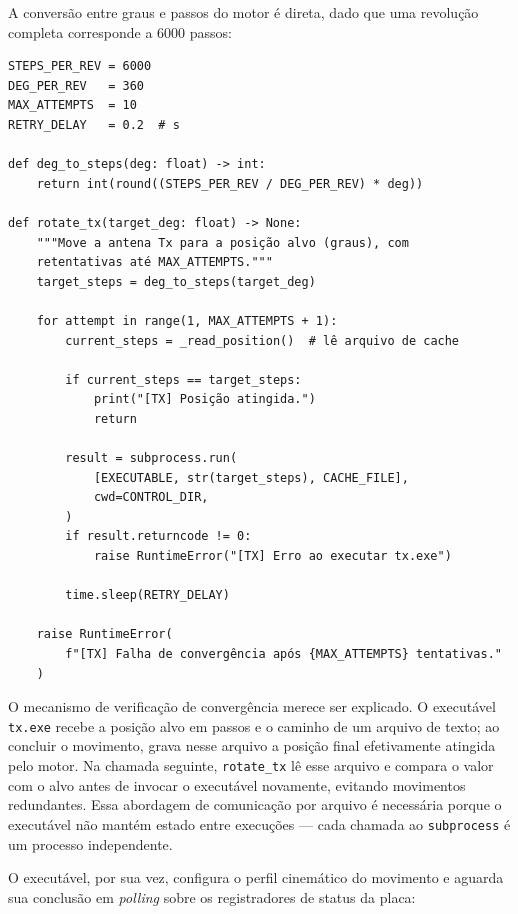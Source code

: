 \documentclass[12pt, a4paper]{article}
\begin{document}
A conversão entre graus e passos do motor é direta, dado que uma revolução completa corresponde a 6000 passos:

\begin{lstlisting}[style=python, caption={Função principal de controle do motor Tx (\texttt{drivers/tx.py}).}]
STEPS_PER_REV = 6000
DEG_PER_REV   = 360
MAX_ATTEMPTS  = 10
RETRY_DELAY   = 0.2  # s

def deg_to_steps(deg: float) -> int:
    return int(round((STEPS_PER_REV / DEG_PER_REV) * deg))

def rotate_tx(target_deg: float) -> None:
    """Move a antena Tx para a posição alvo (graus), com
    retentativas até MAX_ATTEMPTS."""
    target_steps = deg_to_steps(target_deg)

    for attempt in range(1, MAX_ATTEMPTS + 1):
        current_steps = _read_position()  # lê arquivo de cache

        if current_steps == target_steps:
            print("[TX] Posição atingida.")
            return

        result = subprocess.run(
            [EXECUTABLE, str(target_steps), CACHE_FILE],
            cwd=CONTROL_DIR,
        )
        if result.returncode != 0:
            raise RuntimeError("[TX] Erro ao executar tx.exe")

        time.sleep(RETRY_DELAY)

    raise RuntimeError(
        f"[TX] Falha de convergência após {MAX_ATTEMPTS} tentativas."
    )
\end{lstlisting}

O mecanismo de verificação de convergência merece ser explicado. O executável \texttt{tx.exe} recebe a posição alvo em passos e o caminho de um arquivo de texto; ao concluir o movimento, grava nesse arquivo a posição final efetivamente atingida pelo motor. Na chamada seguinte, \texttt{rotate\_tx} lê esse arquivo e compara o valor com o alvo antes de invocar o executável novamente, evitando movimentos redundantes. Essa abordagem de comunicação por arquivo é necessária porque o executável não mantém estado entre execuções --- cada chamada ao \texttt{subprocess} é um processo independente.

O executável, por sua vez, configura o perfil cinemático do movimento e aguarda sua conclusão em \textit{polling} sobre os registradores de status da placa:
\end{document}
